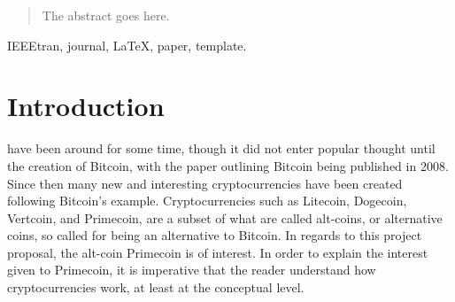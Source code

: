 \documentclass[journal]{IEEEtran}
\begin{document}







\maketitle

\begin{abstract}
The abstract goes here.
\end{abstract}

\begin{IEEEkeywords}
IEEEtran, journal, \LaTeX, paper, template.
\end{IEEEkeywords}






%
\IEEEpeerreviewmaketitle



\section{Introduction}
% 
% 
% 
% 
 have been around for some time, though it did not enter popular thought until the creation of Bitcoin, with the paper outlining Bitcoin being published in 2008. Since then many new and
interesting cryptocurrencies have been created following Bitcoin's example.
Cryptocurrencies such as Litecoin, Dogecoin, Vertcoin, and Primecoin,
are a subset of what are called alt-coins, or alternative coins, so called for being an alternative to Bitcoin.
In regards to this project proposal, the alt-coin Primecoin is
of interest. In order to explain the interest given to Primecoin, it is imperative that the reader understand how cryptocurrencies work, at least at the conceptual level.
\end{document}
